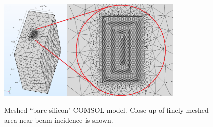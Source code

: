 \documentclass{iucr}
\begin{document}







\begin{figure}
\caption{Meshed ``bare silicon" COMSOL model. Close up of finely meshed area near beam incidence is shown.}
\includegraphics[width = 8.85cm]{images/bare_silicon.png}
\label{fig:bare_silicon}
\end{figure}
\end{document}
